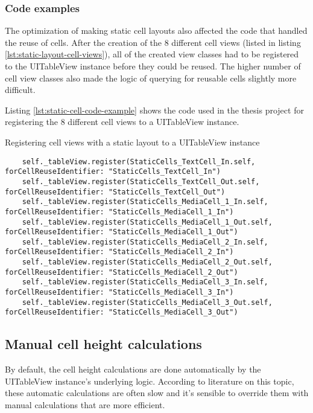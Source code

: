 \documentclass[a4paper,12pt]{article}
\begin{document}
\subsubsection{Code examples}
The optimization of making static cell layouts also affected the code that handled the reuse of cells. After the creation of the 8 different cell views (listed in listing \autoref{lst:static-layout-cell-views}), all of the created view classes had to be registered to the UITableView instance before they could be reused. The higher number of cell view classes also made the logic of querying for reusable cells slightly more difficult.

Listing \autoref{lst:static-cell-code-example} shows the code used in the thesis project for registering the 8 different cell views to a UITableView instance.
\begin{listing}[H]
  \caption{Registering cell views with a static layout to a UITableView instance}
  \label{lst:static-cell-code-example}
  \begin{verbatim}
    self._tableView.register(StaticCells_TextCell_In.self, forCellReuseIdentifier: "StaticCells_TextCell_In")
    self._tableView.register(StaticCells_TextCell_Out.self, forCellReuseIdentifier: "StaticCells_TextCell_Out")
    self._tableView.register(StaticCells_MediaCell_1_In.self, forCellReuseIdentifier: "StaticCells_MediaCell_1_In")
    self._tableView.register(StaticCells_MediaCell_1_Out.self, forCellReuseIdentifier: "StaticCells_MediaCell_1_Out")
    self._tableView.register(StaticCells_MediaCell_2_In.self, forCellReuseIdentifier: "StaticCells_MediaCell_2_In")
    self._tableView.register(StaticCells_MediaCell_2_Out.self, forCellReuseIdentifier: "StaticCells_MediaCell_2_Out")
    self._tableView.register(StaticCells_MediaCell_3_In.self, forCellReuseIdentifier: "StaticCells_MediaCell_3_In")
    self._tableView.register(StaticCells_MediaCell_3_Out.self, forCellReuseIdentifier: "StaticCells_MediaCell_3_Out")
  \end{verbatim}
\end{listing}

\subsection{Manual cell height calculations}
\label{subsec:manual-cell-height-calculations}
By default, the cell height calculations are done automatically by the UITableView instance's underlying logic. According to literature on this topic, these automatic calculations are often slow and it's sensible to override them with manual calculations that are more efficient.\cite{PerfectSmoothScrollingInUITableViews}\cite{HowToMakeDynamicTableViewCellHeight}\cite{MediumSmoothScrollPrearo}
\end{document}
